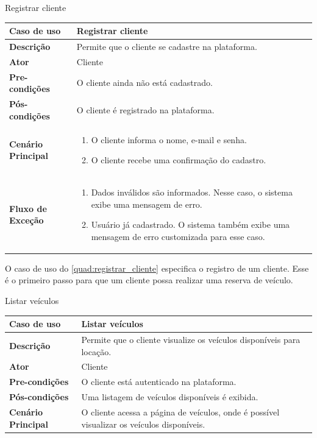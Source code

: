 \begin{quadro}[H]
    \centering
    \caption{Registrar cliente}
    \label{quad:registrar_cliente}
    \begin{tabular}{|p{1.2in}|p{3.5in}|}
    \hline
    
    \textbf{Caso de uso} & Registrar cliente \\ \hline
    \textbf{Descrição} & Permite que o cliente se cadastre na plataforma. \\ \hline
    \textbf{Ator} & Cliente \\ \hline
    \textbf{Pre-condições} & O cliente ainda não está cadastrado. \\ \hline
    \textbf{Pós-condições} & O cliente é registrado na plataforma.\\ \hline
    \textbf{Cenário Principal} & \begin{enumerate}
        \item O cliente informa o nome, e-mail e senha.
        \item O cliente recebe uma confirmação do cadastro.
    \end{enumerate}  \\ \hline
    \textbf{Fluxo de Exceção} & \begin{enumerate}
        \item Dados inválidos são informados. Nesse caso, o sistema exibe uma mensagem de erro.
        \item Usuário já cadastrado. O sistema também exibe uma mensagem de erro customizada para esse caso.
    \end{enumerate}  \\ \hline
    \end{tabular}
\end{quadro}

O caso de uso do \autoref{quad:registrar_cliente} especifica o registro de um cliente. Esse é o primeiro passo para que um cliente possa realizar uma reserva de veículo.

\begin{quadro}[H]
    \centering
    \caption{Listar veículos}
    \label{quad:listar_veiculos}
    \begin{tabular}{|p{1.2in}|p{3.5in}|}
    \hline
    
    \textbf{Caso de uso} & Listar veículos \\ \hline
    \textbf{Descrição} & Permite que o cliente visualize os veículos disponíveis para locação. \\ \hline
    \textbf{Ator} & Cliente \\ \hline
    \textbf{Pre-condições} & O cliente está autenticado na plataforma. \\ \hline
    \textbf{Pós-condições} & Uma listagem de veículos disponíveis é exibida. \\ \hline
    \textbf{Cenário Principal} & O cliente acessa a página de veículos, onde é possível visualizar os veículos disponíveis. \\ \hline
    
    \end{tabular}
\end{quadro}

